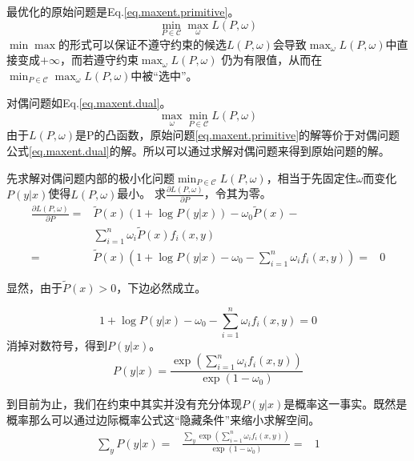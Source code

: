 \documentclass{article}
\begin{document}
       最优化的原始问题是Eq.\ref{eq.maxent.primitive}。
   \begin{equation}
   	  \min_{P\in\mathcal{C}}\max_{\omega}L(P, \omega) \label{eq.maxent.primitive}
   \end{equation}
       $\min\max$的形式可以保证不遵守约束的候选$L(P,\omega)$会导致$\max_{\omega}L(P,\omega)$中直接变成$+\infty$，而若遵守约束$\max_{\omega}L(P,\omega)$
   仍为有限值，从而在$\min_{P\in\mathcal{C}}\max_{\omega}L(P,\omega)$中被“选中”。
   
       对偶问题如Eq.\ref{eq.maxent.dual}。
   \begin{equation}
   	  \max_{\omega}\min_{P\in\mathcal{C}}L(P, \omega) \label{eq.maxent.dual}
   \end{equation}
	    由于$L(P,\omega)$是P的凸函数，原始问题\ref{eq.maxent.primitive}的解等价于对偶问题公式\ref{eq.maxent.dual}的解。所以可以通过求解对偶问题来得到原始问题的解。
	
	    先求解对偶问题内部的极小化问题$\min_{P\in\mathcal{C}}L(P, \omega)$，相当于先固定住$\omega$而变化$P(y|x)$使得$L(P,\omega)$最小。
	求$ \frac{\partial L(P, \omega)}{\partial P}$，令其为零。
	\begin{equation}
		\begin{aligned}
			\frac{\partial L(P, \omega)}{\partial P} = &\tilde{P}(x)(1+\log{P(y|x)}) -\omega_{0}\tilde{P}(x) -\\
			&\sum_{i=1}^{n}\omega_{i}\tilde{P}(x)f_{i}(x,y)\\
			=&\tilde{P}(x)(1+\log{P(y|x)}-\omega_{0}-\sum_{i=1}^{n}\omega_{i}f_{i}(x,y))
			=&0
		\end{aligned}
	\end{equation}

       显然，由于$\tilde{P}(x)>0$，下边必然成立。
       
	\begin{equation}
		1+\log{P(y|x)}-\omega_{0}-\sum_{i=1}^{n}\omega_{i}f_{i}(x,y)=0 
	\end{equation}    
	消掉对数符号，得到$P(y|x)$。
	\begin{equation}
	P(y|x) =  \frac{\exp(\sum_{i=1}^{n}\omega_{i}f_{i}(x,y))}{\exp{(1-\omega_{0})}}
	\end{equation}    	
	
    	到目前为止，我们在约束中其实并没有充分体现$P(y|x)$是概率这一事实。既然是概率那么可以通过边际概率公式这“隐藏条件”来缩小求解空间。
	\begin{equation}
		\begin{aligned}
			\sum_{y}P(y|x) =  &\frac{\sum_{y}\exp{(\sum_{i=1}^{n}\omega_{i}f_{i}(x,y))}}{\exp{(1-\omega_{0})}}
			 =&1
		\end{aligned}
	\end{equation}
        
\end{document}
